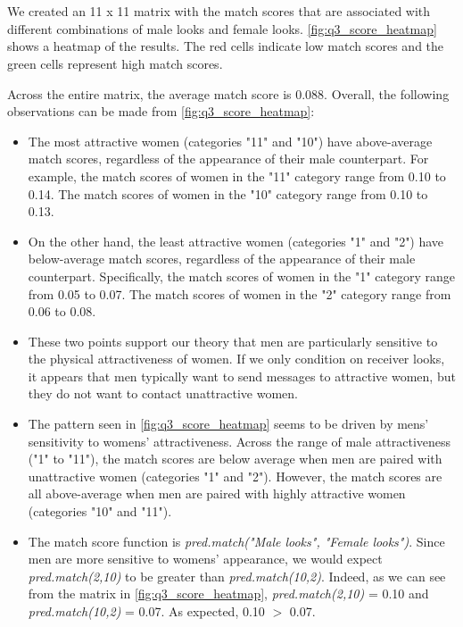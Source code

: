 \section{}
We created an 11 x 11 matrix with the match scores that are associated with different combinations of male looks and female looks. \vref{fig:q3_score_heatmap} shows a heatmap of the results. The red cells indicate low match scores and the green cells represent high match scores. 

Across the entire matrix, the average match score is 0.088. Overall, the following observations can be made from \cref{fig:q3_score_heatmap}:
\begin{itemize}
\item The most attractive women (categories "11" and "10") have above-average match scores, regardless of the appearance of their male counterpart. For example, the match scores of women in the "11" category range from 0.10 to 0.14. The match scores of women in the "10" category range from 0.10 to 0.13.

\item On the other hand, the least attractive women (categories "1" and "2") have below-average match scores, regardless of the appearance of their male counterpart. Specifically, the  match scores of women in the "1" category range from 0.05 to 0.07. The match scores of women in the "2" category range from 0.06 to 0.08.

\item These two points support our theory that men are particularly sensitive to the physical attractiveness of women. If we only condition on receiver looks, it appears that men typically want to send messages to attractive women, but they do not want to contact unattractive women.

\item The pattern seen in \cref{fig:q3_score_heatmap} seems to be driven by mens' sensitivity to womens' attractiveness. Across the range of male attractiveness ("1" to "11"), the match scores are below average when men are paired with unattractive women (categories "1" and "2"). However, the match scores are all above-average when men are paired with highly attractive women (categories "10" and "11").

\item The match score function is \textit{pred.match("Male looks", "Female looks")}. Since men are more sensitive to womens' appearance, we would expect \textit{pred.match(2,10)} to be greater than \textit{pred.match(10,2)}. Indeed, as we can see from the matrix in \cref{fig:q3_score_heatmap}, \textit{pred.match(2,10)} = 0.10 and \textit{pred.match(10,2)} = 0.07. As expected, 0.10 $>$ 0.07.

\end{itemize}

